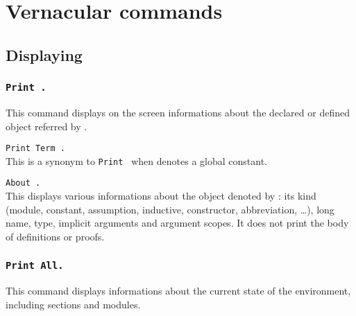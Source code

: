 \chapter[Vernacular commands]{Vernacular commands\label{Vernacular-commands}
\label{Other-commands}}

\section{Displaying}

\subsection[\tt Print {\qualid}.]{\tt Print {\qualid}.}
This command displays on the screen informations about the declared or
defined object referred by {\qualid}.

\begin{ErrMsgs}
\item {\qualid} 
\end{ErrMsgs}

\begin{Variants}
\item {\tt Print Term {\qualid}.}
\\ 
This is a synonym to {\tt Print {\qualid}} when {\qualid} denotes a
global constant. 

\item {\tt About {\qualid}.}
\label{About}
\\ 
This displays various informations about the object denoted by {\qualid}:
its kind (module, constant, assumption, inductive,
constructor, abbreviation, \ldots), long name, type, implicit
arguments and argument scopes. It does not print the body of
definitions or proofs.

\end{Variants}

\subsection[\tt Print All.]{\tt Print All.}
This command displays informations about the current state of the
environment, including sections and modules.

